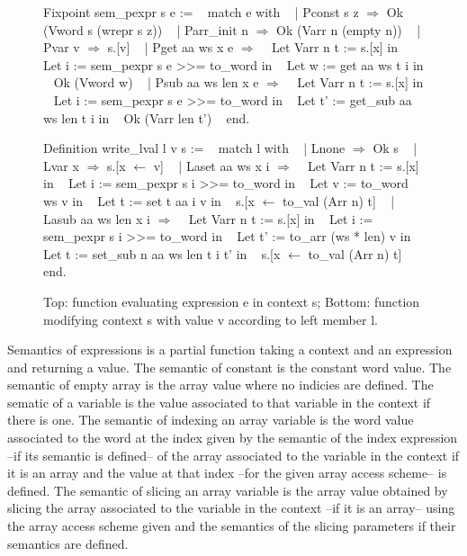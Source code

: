 \documentclass{article}
\begin{document}
\medskip

\begin{figure}
\obeylines\obeyspaces\ttfamily%
Fixpoint sem\_pexpr s e :=
~ match e with
~ | Pconst s z \(\Rightarrow\) Ok (Vword s (wrepr s z))
~ | Parr\_init n \(\Rightarrow\) Ok (Varr n (empty n))
~ | Pvar v \(\Rightarrow\) s.[v]
~ | Pget aa ws x e \(\Rightarrow\)
~   Let Varr n t := s.[x] in
~   Let i := sem\_pexpr s e >{}>= to\_word in
~   Let w := get aa ws t i in
~   Ok (Vword w)
~ | Psub aa ws len x e \(\Rightarrow\)
~   Let Varr n t := s.[x] in
~   Let i := sem\_pexpr s e >{}>= to\_word in
~   Let t' := get\_sub aa ws len t i in
~   Ok (Varr len t')
~ end.

Definition write\_lval l v s :=
~ match l with
~ | Lnone \(\Rightarrow\) Ok s
~ | Lvar x \(\Rightarrow\) s.[x \(\leftarrow\) v]
~ | Laset aa ws x i \(\Rightarrow\)
~   Let Varr n t := s.[x] in
~   Let i := sem\_pexpr s i >{}>= to\_word in
~   Let v := to\_word ws v in
~   Let t := set t aa i v in
~   s.[x \(\leftarrow\) to\_val (Arr n) t]
~ | Lasub aa ws len x i \(\Rightarrow\)
~   Let Varr n t := s.[x] in
~   Let i := sem\_pexpr s i >{}>= to\_word in
~   Let t' := to\_arr (ws * len) v in 
~   Let t := set\_sub n aa ws len t i t' in
~   s.[x \(\leftarrow\) to\_val (Arr n) t]
~ end.
\normalfont%
\caption{Top: function evaluating expression e in context s; %
Bottom: function modifying context s with value v according to left member l.}
\end{figure}

Semantics of expressions is a partial function taking a context and an
expression and returning a value.
The semantic of constant is the constant word value. The semantic of empty array
is the array value where no indicies are defined. The sematic of a variable is
the value associated to that variable in the context if there is one. The
semantic of indexing an array variable is the word value associated to the word
at the index given by the semantic of the index expression --if its semantic
is defined-- of the array associated to the variable in the context if it is an
array and the value at that index --for the given array access scheme-- is
defined. The semantic of slicing an array variable is the array value obtained
by slicing the array associated to the variable in the context --if it is an
array-- using the array access scheme given and the semantics of the slicing
parameters if their semantics are defined.

\smallskip
\end{document}
